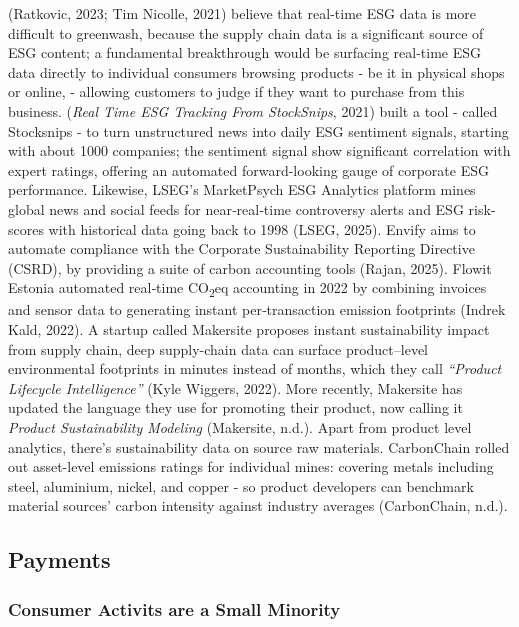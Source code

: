 \documentclass[
  12pt,
  letterpaper,
  DIV=11,
  numbers=noendperiod]{scrartcl}
\begin{document}
(Ratkovic, 2023; Tim Nicolle, 2021) believe that real-time ESG data is
more difficult to greenwash, because the supply chain data is a
significant source of ESG content; a fundamental breakthrough would be
surfacing real-time ESG data directly to individual consumers browsing
products - be it in physical shops or online, - allowing customers to
judge if they want to purchase from this business. (\emph{Real {Time ESG
Tracking From StockSnips}}, 2021) built a tool - called Stocksnips - to
turn unstructured news into daily ESG sentiment signals, starting with
about 1000 companies; the sentiment signal show significant correlation
with expert ratings, offering an automated forward-looking gauge of
corporate ESG performance. Likewise, LSEG's MarketPsych ESG Analytics
platform mines global news and social feeds for near‐real‐time
controversy alerts and ESG risk‐scores with historical data going back
to 1998 (LSEG, 2025). Envify aims to automate compliance with the
Corporate Sustainability Reporting Directive (CSRD), by providing a
suite of carbon accounting tools (Rajan, 2025). Flowit Estonia automated
real‐time CO\textsubscript{2}eq accounting in 2022 by combining invoices
and sensor data to generating instant per‐transaction emission
footprints (Indrek Kald, 2022). A startup called Makersite proposes
instant sustainability impact from supply chain, deep supply-chain data
can surface product--level environmental footprints in minutes instead
of months, which they call \emph{``Product Lifecycle Intelligence''}
(Kyle Wiggers, 2022). More recently, Makersite has updated the language
they use for promoting their product, now calling it \emph{Product
Sustainability Modeling} (Makersite, n.d.). Apart from product level
analytics, there's sustainability data on source raw materials.
CarbonChain rolled out asset-level emissions ratings for individual
mines: covering metals including steel, aluminium, nickel, and copper -
so product developers can benchmark material sources' carbon intensity
against industry averages (CarbonChain, n.d.).

\subsection{Payments}\label{payments}

\subsubsection{Consumer Activits are a Small
Minority}\label{consumer-activits-are-a-small-minority}
\end{document}
